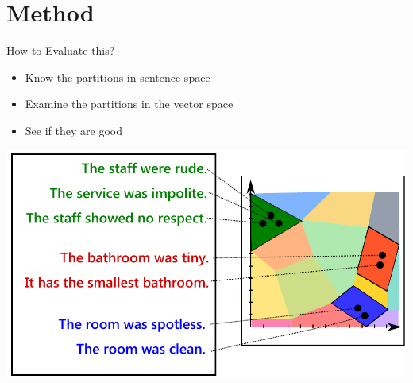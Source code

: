\documentclass[12pt,landscape,english]{beamer}
\begin{document}
\section{Method}
\begin{frame}{How to Evaluate this?}
	\begin{itemize}
		\item Know the partitions in sentence space  
		\item Examine the partitions in the vector space
		\item See if they are \alert{good}
	\end{itemize}
	\vfill
	\centering\includegraphics[scale=0.4]{equiv}
\end{frame}


\newcommand{\nitem}[1]{\begin{itemize}
		\item #1
	\end{itemize}}
\end{document}
